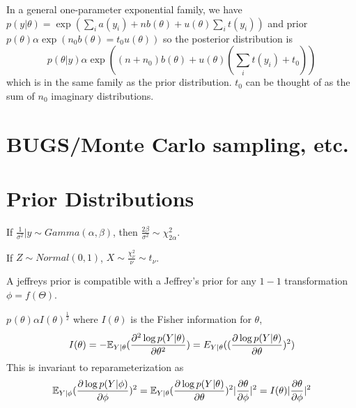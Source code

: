 \begin{thm}
  \label{sec:conjugate-analysis-4}
  In a general one-parameter exponential family, we have $p(y |
  \theta) = \exp(\sum_{i} a(y_{i}) + nb(\theta) + u(\theta)
  \sum_{i}^{} t(y_{i}))$ and prior $p(\theta) \alpha \exp(n_{0}
  b(\theta) = t_{0} u(\theta))$ so the posterior distribution is
  \begin{equation}
    \label{eq:12}
    p(\theta | y) \alpha \exp((n + n_{0})b(\theta) +
    u(\theta)(\sum_{i}^{} t(y_{i}) + t_{0}))
  \end{equation} which is in the same family as the prior
  distribution.  $t_{0}$ can be thought of as the sum of $n_{0}$
  imaginary distributions.
\end{thm}

\section{BUGS/Monte Carlo sampling, etc.}
\label{sec:bugsm-carlo-sampl}


\section{Prior Distributions}
\label{sec:prior-distributions}

\begin{thm}
  \label{sec:prior-distributions-2}
  If $\frac{1}{\sigma^{2}}|y \sim Gamma(\alpha, \beta)$, then $\frac{2
    \beta}{\sigma^{2}} \sim \chi^{2}_{2 \alpha}$.

  If $Z \sim Normal(0, 1)$, $X \sim \frac{\chi^{2}_{\nu}}{\nu} \sim
  t_{\nu}$.
\end{thm}

\begin{defn}
  \label{sec:prior-distributions-3}
  A jeffreys prior is compatible with a Jeffrey's prior for any $1-1$
  transformation $\phi = f(\Theta)$.
\item $p_{}(\theta) \alpha I(\theta)^{\frac{1}{2}}$ where $I(\theta)$
  is the Fisher information for $\theta$,
  \begin{equation}
    \label{eq:13}
    I(\theta) = -\E_{Y|\theta}(\frac{\partial^{2} \log
      p(Y|\theta)}{\partial \theta^{2}}) =
    E_{Y|\theta}((\frac{\partial \log p(Y|\theta)}{\partial \theta})^{2})
  \end{equation}
  This is invariant to reparameterization as
  \begin{align}
    \label{eq:14}
    \E_{Y | \phi}(\frac{\partial \log p(Y| \phi)}{\partial
      \phi})^{2} = \E_{Y|\theta}(\frac{\partial \log
      p(Y|\theta)}{\partial \theta})^{2} |\frac{\partial
      \theta}{\partial \phi} |^{2} = I(\theta) | \frac{\partial
      \theta}{\partial \phi} |^{2}
  \end{align}
\end{defn}

